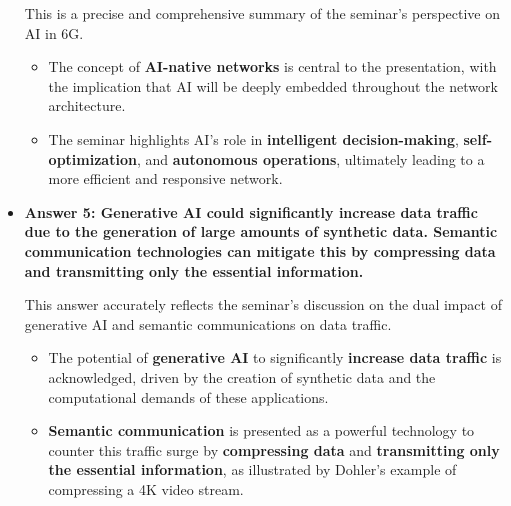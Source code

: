 \documentclass[
]{article}
\begin{document}
\begin{itemize}
  This is a precise and comprehensive summary of the seminar's
  perspective on AI in 6G.

  \begin{itemize}
  
  \item
    The concept of \textbf{AI-native networks} is central to the
    presentation, with the implication that AI will be deeply embedded
    throughout the network architecture.
  \item
    The seminar highlights AI's role in \textbf{intelligent
    decision-making}, \textbf{self-optimization}, and \textbf{autonomous
    operations}, ultimately leading to a more efficient and responsive
    network.
  \end{itemize}
\item
  \textbf{Answer 5: Generative AI could significantly increase data
  traffic due to the generation of large amounts of synthetic data.
  Semantic communication technologies can mitigate this by compressing
  data and transmitting only the essential information.}

  This answer accurately reflects the seminar's discussion on the dual
  impact of generative AI and semantic communications on data traffic.

  \begin{itemize}
  
  \item
    The potential of \textbf{generative AI} to significantly
    \textbf{increase data traffic} is acknowledged, driven by the
    creation of synthetic data and the computational demands of these
    applications.
  \item
    \textbf{Semantic communication} is presented as a powerful
    technology to counter this traffic surge by \textbf{compressing
    data} and \textbf{transmitting only the essential information}, as
    illustrated by Dohler's example of compressing a 4K video stream.
  \end{itemize}
\end{itemize}
\end{document}
